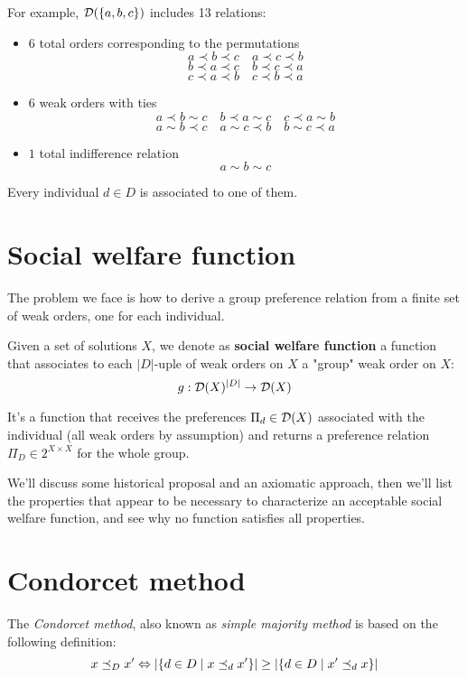 For example, $\operatorname{\mathcal{D}}(\{a, b, c\})$ includes 13 relations: 
\begin{itemize}
	\item $6$ total orders corresponding to the permutations
	$$ a \prec b \prec c \quad a \prec c \prec b $$ 
	$$ b \prec a \prec c \quad b \prec c \prec a $$
	$$ c \prec a \prec b \quad c \prec b \prec a $$
	
	\item $6$ weak orders with ties 
	$$ a \prec b \sim c \quad b \prec a \sim c \quad c \prec a \sim b $$
	$$ a \sim b \prec c \quad a \sim c \prec b \quad b \sim c \prec a $$
	
	\item $1$ total indifference relation
	$$ a \sim b \sim c $$
\end{itemize}
Every individual $d \in D$ is associated to one of them.

\section{Social welfare function}

The problem we face is how to derive a group preference relation from a finite set of weak orders, one for each individual. \\

\begin{definition}
	Given a set of solutions $X$, we denote as \textbf{social welfare function} a function that associates to each $|D|$-uple of weak orders on $X$ a "group" weak order on $X$:
	$$ g: \operatorname{\mathcal{D}} (X)^{|D|} \rightarrow \operatorname{\mathcal{D}}(X) $$
\end{definition}

It's a function that receives the preferences $\Pi_d \in \operatorname{\mathcal{D}}(X)$ associated with the individual (all weak orders by assumption) and returns a preference relation $\Pi_D \in 2^{X \times X}$ for the whole group.

We'll discuss some historical proposal and an axiomatic approach, then we'll list the properties that appear to be necessary to characterize an acceptable social welfare function, and see why no function satisfies all properties.

\section{Condorcet method}

The \textit{Condorcet method}, also known as \textit{simple majority method} is based on the following definition: 
$$ x \preceq_{D} x' \Leftrightarrow \left|\left\{d \in D \mid x \preceq_{d} x' \right\}\right| \geq \left|\left\{d \in D \mid x' \preceq_{d} x \right\}\right|$$ 

